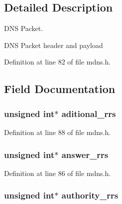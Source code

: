 \subsection{Detailed Description}
D\-N\-S Packet. 

D\-N\-S Packet header and payload 

Definition at line 82 of file mdns.\-h.



\subsection{Field Documentation}
\hypertarget{structdns__packet__t_afa34bab568a73c5af6fc84ed676ed21f}{
\subsubsection[{aditional\-\_\-rrs}]{\setlength{\rightskip}{0pt plus 5cm}unsigned int$\ast$ aditional\-\_\-rrs}}\label{structdns__packet__t_afa34bab568a73c5af6fc84ed676ed21f}


Definition at line 88 of file mdns.\-h.

\hypertarget{structdns__packet__t_ae0c9f53013dea2787cfdf2cff74b76ba}{
\subsubsection[{answer\-\_\-rrs}]{\setlength{\rightskip}{0pt plus 5cm}unsigned int$\ast$ answer\-\_\-rrs}}\label{structdns__packet__t_ae0c9f53013dea2787cfdf2cff74b76ba}


Definition at line 86 of file mdns.\-h.

\hypertarget{structdns__packet__t_abef983e2aec9c20ff1da712f4030fdba}{
\subsubsection[{authority\-\_\-rrs}]{\setlength{\rightskip}{0pt plus 5cm}unsigned int$\ast$ authority\-\_\-rrs}}\label{structdns__packet__t_abef983e2aec9c20ff1da712f4030fdba}


